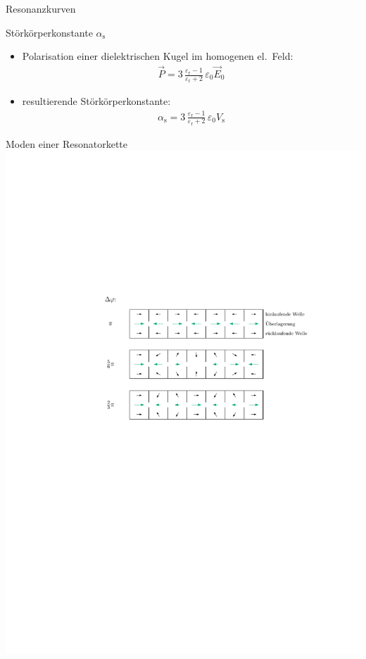 \documentclass[12pt,xcolor=dvipsnames,professionalfonts]{beamer}
\begin{document}
\begin{frame}{Resonanzkurven}
	\begin{small}
		\centering
		
	\end{small}
\end{frame}

\begin{frame}{Störkörperkonstante $\alpha_\mathrm{s}$}
	\begin{itemize}
		\item Polarisation einer dielektrischen Kugel im homogenen el.\ Feld:
		\begin{align*}
			  \vec{P} = 3 \, \frac{\varepsilon_\mathrm{r} - 1}{\varepsilon_\mathrm{r} + 2} \, \varepsilon_0 \vec{E}_0
		\end{align*}
		
		\item resultierende Störkörperkonstante:
		\begin{align*}
			\alpha_\mathrm{s} = 3 \, \frac{\varepsilon_\mathrm{r} - 1}{\varepsilon_\mathrm{r} + 2} \, \varepsilon_0 V_\mathrm{s}
		\end{align*}
	\end{itemize}
\end{frame}

\begin{frame}{Moden einer Resonatorkette}
	\includegraphics[scale=0.9]{./figures/phasoren_top.pdf}
\end{frame}
\end{document}
